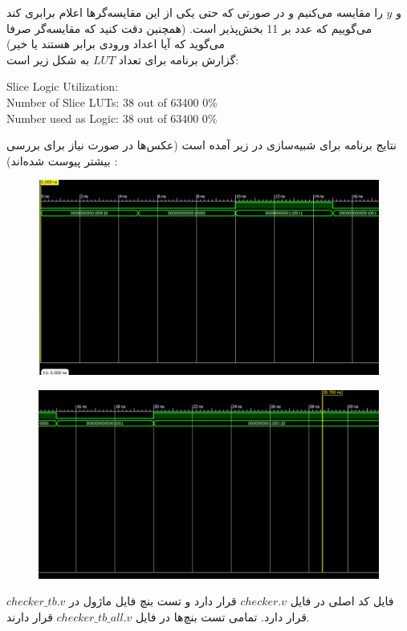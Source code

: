 \documentclass[a4paper,12pt]{article}
\begin{document}
و
$y$
را مقایسه می‌کنیم و در صورتی که حتی یکی از این مقایسه‌گرها اعلام برابری کند می‌گوییم که عدد بر 11 بخش‌پذیر است. (همچنین دقت کنید که مقایسه‌گر صرفا می‌گوید که آیا اعداد ورودی برابر هستند یا خیر)\\
گزارش برنامه برای تعداد $LUT$ به شکل زیر است:
\begin{center}
\begin{latin}
Slice Logic Utilization: \\
 Number of Slice LUTs:                   38  out of  63400     0\%  \\
    Number used as Logic:                38  out of  63400     0\%\\
\end{latin}
\end{center}
نتایج برنامه برای شبیه‌سازی در زیر آمده است (عکس‌ها در صورت نیاز برای بررسی بیشتر پیوست شده‌اند) :\\
\begin{figure}[H]
 \centering
  \includegraphics[width=0.8\linewidth]{s1}
\end{figure}
\begin{figure}[H]
 \centering
  \includegraphics[width=0.8\linewidth]{s2}
\end{figure}
فایل کد اصلی در فایل
$checker.v$
قرار دارد و تست بنچ فایل ماژول در
$checker\_tb.v$
قرار دارد. تمامی تست بنچ‌ها در فایل
$checker\_tb\_all.v$
قرار دارند.\\
\end{document}

